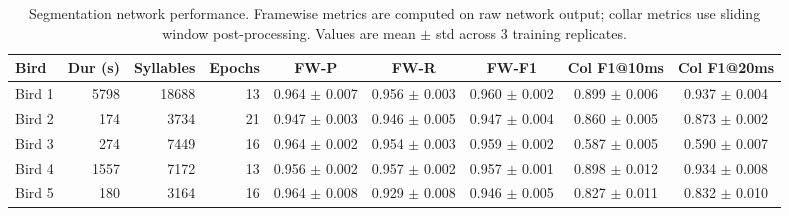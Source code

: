 \begin{table}[ht]
\centering
\caption{Segmentation network performance. Framewise metrics are computed on raw network output; collar metrics use sliding window post-processing. Values are mean $\pm$ std across 3 training replicates.}
\begin{tabular}{l r r r c c c c c}
\toprule
Bird & Dur (s) & Syllables & Epochs & FW-P & FW-R & FW-F1 & Col F1@10ms & Col F1@20ms \\
\midrule
Bird 1 & 5798 & 18688 & 13 & 0.964 $\pm$ 0.007 & 0.956 $\pm$ 0.003 & 0.960 $\pm$ 0.002 & 0.899 $\pm$ 0.006 & 0.937 $\pm$ 0.004 \\
Bird 2 & 174 & 3734 & 21 & 0.947 $\pm$ 0.003 & 0.946 $\pm$ 0.005 & 0.947 $\pm$ 0.004 & 0.860 $\pm$ 0.005 & 0.873 $\pm$ 0.002 \\
Bird 3 & 274 & 7449 & 16 & 0.964 $\pm$ 0.002 & 0.954 $\pm$ 0.003 & 0.959 $\pm$ 0.002 & 0.587 $\pm$ 0.005 & 0.590 $\pm$ 0.007 \\
Bird 4 & 1557 & 7172 & 13 & 0.956 $\pm$ 0.002 & 0.957 $\pm$ 0.002 & 0.957 $\pm$ 0.001 & 0.898 $\pm$ 0.012 & 0.934 $\pm$ 0.008 \\
Bird 5 & 180 & 3164 & 16 & 0.964 $\pm$ 0.008 & 0.929 $\pm$ 0.008 & 0.946 $\pm$ 0.005 & 0.827 $\pm$ 0.011 & 0.832 $\pm$ 0.010 \\
\bottomrule
\end{tabular}
\end{table}
